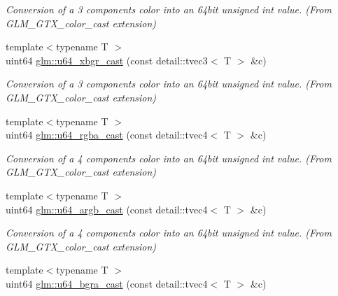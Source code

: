 \begin{DoxyCompactItemize}
\begin{DoxyCompactList}\small\item\em Conversion of a 3 components color into an 64bit unsigned int value. (From G\+L\+M\+\_\+\+G\+T\+X\+\_\+color\+\_\+cast extension) \end{DoxyCompactList}\item 
\hypertarget{group__gtx__color__cast_gaa93895af1b887b39ad7f1980cc995a32}{}{\footnotesize template$<$typename T $>$ }\\uint64 \hyperlink{group__gtx__color__cast_gaa93895af1b887b39ad7f1980cc995a32}{glm\+::u64\+\_\+xbgr\+\_\+cast} (const detail\+::tvec3$<$ T $>$ \&c)\label{group__gtx__color__cast_gaa93895af1b887b39ad7f1980cc995a32}

\begin{DoxyCompactList}\small\item\em Conversion of a 3 components color into an 64bit unsigned int value. (From G\+L\+M\+\_\+\+G\+T\+X\+\_\+color\+\_\+cast extension) \end{DoxyCompactList}\item 
\hypertarget{group__gtx__color__cast_gaecab5d0a70ac7d721ab26b8592c836d8}{}{\footnotesize template$<$typename T $>$ }\\uint64 \hyperlink{group__gtx__color__cast_gaecab5d0a70ac7d721ab26b8592c836d8}{glm\+::u64\+\_\+rgba\+\_\+cast} (const detail\+::tvec4$<$ T $>$ \&c)\label{group__gtx__color__cast_gaecab5d0a70ac7d721ab26b8592c836d8}

\begin{DoxyCompactList}\small\item\em Conversion of a 4 components color into an 64bit unsigned int value. (From G\+L\+M\+\_\+\+G\+T\+X\+\_\+color\+\_\+cast extension) \end{DoxyCompactList}\item 
\hypertarget{group__gtx__color__cast_ga6f979d8e3e5435b048799ade4fe34275}{}{\footnotesize template$<$typename T $>$ }\\uint64 \hyperlink{group__gtx__color__cast_ga6f979d8e3e5435b048799ade4fe34275}{glm\+::u64\+\_\+argb\+\_\+cast} (const detail\+::tvec4$<$ T $>$ \&c)\label{group__gtx__color__cast_ga6f979d8e3e5435b048799ade4fe34275}

\begin{DoxyCompactList}\small\item\em Conversion of a 4 components color into an 64bit unsigned int value. (From G\+L\+M\+\_\+\+G\+T\+X\+\_\+color\+\_\+cast extension) \end{DoxyCompactList}\item 
\hypertarget{group__gtx__color__cast_ga165b688bb6ecf2fb3e0aa87925815487}{}{\footnotesize template$<$typename T $>$ }\\uint64 \hyperlink{group__gtx__color__cast_ga165b688bb6ecf2fb3e0aa87925815487}{glm\+::u64\+\_\+bgra\+\_\+cast} (const detail\+::tvec4$<$ T $>$ \&c)\label{group__gtx__color__cast_ga165b688bb6ecf2fb3e0aa87925815487}


\end{DoxyCompactItemize}

